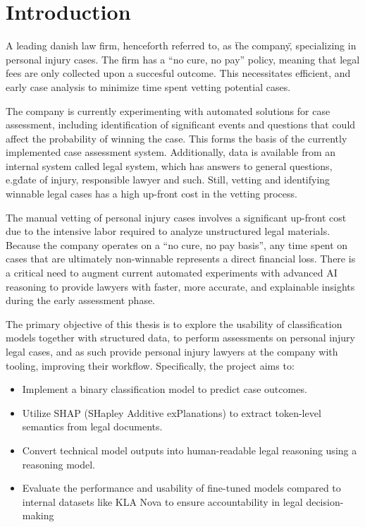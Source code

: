 \section{Introduction}
A leading danish law firm, henceforth referred to, as \"the company\", specializing in personal injury cases. The firm has a “no cure, no pay” policy, meaning that legal fees are only collected upon a succesful outcome. This necessitates efficient, and early case analysis to minimize time spent vetting potential cases.

The company is currently experimenting with automated solutions for case assessment, including identification of significant events and questions that could affect the probability of winning the case. This forms the basis of the currently implemented case assessment system. Additionally, data is available from an internal system called legal system, which has answers to general questions, e.g\. date of injury, responsible lawyer and such. Still, vetting and identifying winnable legal cases has a high up-front cost in the vetting process.

The manual vetting of personal injury cases involves a significant up-front cost due to the intensive labor required to analyze unstructured legal materials. Because the company operates on a ``no cure, no pay basis'', any time spent on cases that are ultimately non-winnable represents a direct financial loss. There is a critical need to augment current automated experiments with advanced AI reasoning to provide lawyers with faster, more accurate, and explainable insights during the early assessment phase.

The primary objective of this thesis is to explore the usability of classification models together with structured data, to perform assessments on personal injury legal cases, and as such provide personal injury lawyers at the company with tooling, improving their workflow. Specifically, the project aims to:
\begin{itemize}
  \item Implement a binary classification model to predict case outcomes.
  \item Utilize SHAP (SHapley Additive exPlanations) to extract token-level semantics from legal documents.
  \item Convert technical model outputs into human-readable legal reasoning using a reasoning model.
  \item Evaluate the performance and usability of fine-tuned models compared to internal datasets like KLA Nova to ensure accountability in legal decision-making
\end{itemize}

